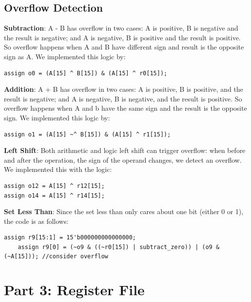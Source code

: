 \documentclass{article}
\begin{document}
\subsection{Overflow Detection}
\textbf{Subtraction}: A - B has overflow in two cases: A is positive, B is negative and the result is negative; and A is negative, B is positive and the result is positive. So overflow happens when A and B have different sign and result is the opposite sign as A. We implemented this logic by: 
\begin{verbatim}
assign o0 = (A[15] ^ B[15]) & (A[15] ^ r0[15]);
\end{verbatim}
\vspace{5mm}
\textbf{Addition}: A + B has overflow in two cases: A is positive, B is positive, and the result is negative; and A is negative, B is negative, and the result is positive. So overflow happens when A and b have the same sign and the result is the opposite sign. We implemented this logic by:
\begin{verbatim}
assign o1 = (A[15] ~^ B[15]) & (A[15] ^ r1[15]);
\end{verbatim}
\vspace{5mm}
\textbf{Left Shift}: 
Both arithmetic and logic left shift can trigger overflow: when before and after the operation, the sign of the operand changes, we detect an overflow. We implemented this with the logic: 
\begin{verbatim}
assign o12 = A[15] ^ r12[15];
assign o14 = A[15] ^ r14[15];
\end{verbatim}
\vspace{5mm}
\textbf{Set Less Than}: 
Since the set less than only cares about one bit (either 0 or 1), the code is as follows: 
\begin{verbatim}
assign r9[15:1] = 15'b000000000000000;
	assign r9[0] = (~o9 & ((~r0[15]) | subtract_zero)) | (o9 & (~A[15])); //consider overflow
\end{verbatim}



\section{Part 3: Register File }
\end{document}
